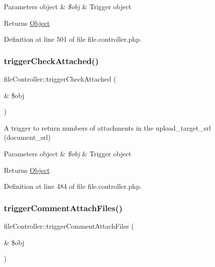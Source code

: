 \begin{DoxyParams}[1]{Parameters}
object & {\em \$obj} & Trigger object \\
\hline
\end{DoxyParams}
\begin{DoxyReturn}{Returns}
\hyperlink{classObject}{Object} 
\end{DoxyReturn}


Definition at line 501 of file file.\+controller.\+php.

\mbox{\label{classfileController_ab23c495b5b662264a1c7adfda86f715f}} 
\subsubsection{\texorpdfstring{trigger\+Check\+Attached()}{triggerCheckAttached()}}
{\footnotesize\ttfamily file\+Controller\+::trigger\+Check\+Attached (\begin{DoxyParamCaption}\item[{\&}]{\$obj }\end{DoxyParamCaption})}

A trigger to return numbers of attachments in the upload\+\_\+target\+\_\+srl (document\+\_\+srl)


\begin{DoxyParams}[1]{Parameters}
object & {\em \$obj} & Trigger object \\
\hline
\end{DoxyParams}
\begin{DoxyReturn}{Returns}
\hyperlink{classObject}{Object} 
\end{DoxyReturn}


Definition at line 484 of file file.\+controller.\+php.

\mbox{\label{classfileController_ab25a513258ef9c9e2dc2af274c9c24e7}} 
\subsubsection{\texorpdfstring{trigger\+Comment\+Attach\+Files()}{triggerCommentAttachFiles()}}
{\footnotesize\ttfamily file\+Controller\+::trigger\+Comment\+Attach\+Files (\begin{DoxyParamCaption}\item[{\&}]{\$obj }\end{DoxyParamCaption})}

